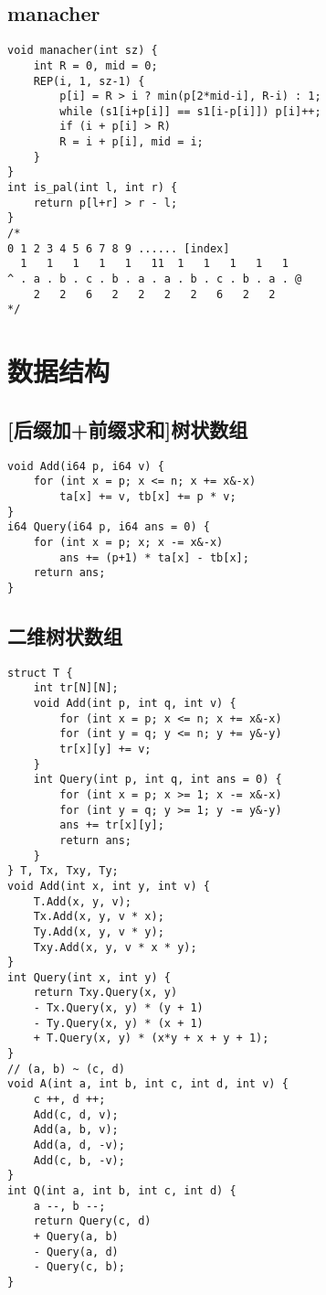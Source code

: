 \documentclass[a4paper,landscape,twocolumn]{ctexart}
\begin{document}
\subsection{manacher}

\begin{lstlisting}
void manacher(int sz) {
	int R = 0, mid = 0;
	REP(i, 1, sz-1) {
		p[i] = R > i ? min(p[2*mid-i], R-i) : 1;
		while (s1[i+p[i]] == s1[i-p[i]]) p[i]++;
		if (i + p[i] > R)
		R = i + p[i], mid = i;
	}
}
int is_pal(int l, int r) {
	return p[l+r] > r - l;
}
/*
0 1 2 3 4 5 6 7 8 9 ...... [index]
  1   1   1   1   1   11  1   1   1   1   1
^ . a . b . c . b . a . a . b . c . b . a . @
    2   2   6   2   2   2   2   6   2   2
*/
\end{lstlisting}

\section{数据结构}

\subsection{[后缀加+前缀求和]树状数组}

\begin{lstlisting}
void Add(i64 p, i64 v) {
	for (int x = p; x <= n; x += x&-x)
		ta[x] += v, tb[x] += p * v;
}
i64 Query(i64 p, i64 ans = 0) {
	for (int x = p; x; x -= x&-x)
		ans += (p+1) * ta[x] - tb[x];
	return ans;
}
\end{lstlisting}

\subsection{二维树状数组}

\begin{lstlisting}
struct T {
	int tr[N][N];
	void Add(int p, int q, int v) {
		for (int x = p; x <= n; x += x&-x)
		for (int y = q; y <= n; y += y&-y)
		tr[x][y] += v;
	}
	int Query(int p, int q, int ans = 0) {
		for (int x = p; x >= 1; x -= x&-x)
		for (int y = q; y >= 1; y -= y&-y)
		ans += tr[x][y];
		return ans;
	}
} T, Tx, Txy, Ty;
void Add(int x, int y, int v) {
	T.Add(x, y, v);
	Tx.Add(x, y, v * x);
	Ty.Add(x, y, v * y);
	Txy.Add(x, y, v * x * y);
}
int Query(int x, int y) {
	return Txy.Query(x, y)
	- Tx.Query(x, y) * (y + 1)
	- Ty.Query(x, y) * (x + 1)
	+ T.Query(x, y) * (x*y + x + y + 1);
}
// (a, b) ~ (c, d)
void A(int a, int b, int c, int d, int v) {
	c ++, d ++;
	Add(c, d, v);
	Add(a, b, v);
	Add(a, d, -v);
	Add(c, b, -v);
}
int Q(int a, int b, int c, int d) {
	a --, b --;
	return Query(c, d)
	+ Query(a, b)
	- Query(a, d)
	- Query(c, b);
}
\end{lstlisting}
\end{document}
